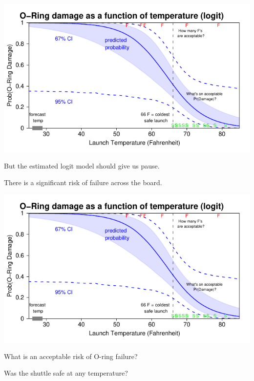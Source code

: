 \documentclass[pdflatex,landscape,titlepage]{foils}
\begin{document}
\begin{center}
\includegraphics[width=10.5 in]{chall6}
\end{center}

\vspace{-2 em}

But the estimated logit model should give us pause.  

There is a significant risk of failure across the board.

\foilhead[-0.75in]{}


\begin{center}
\includegraphics[width=10.5 in]{chall6}
\end{center}

\vspace{-2 em}

What is an acceptable risk of O-ring failure?  

Was the shuttle safe at any temperature?


\foilhead[-0.75in]{}
\bgclear

\vspace{-2 em}
\end{document}
